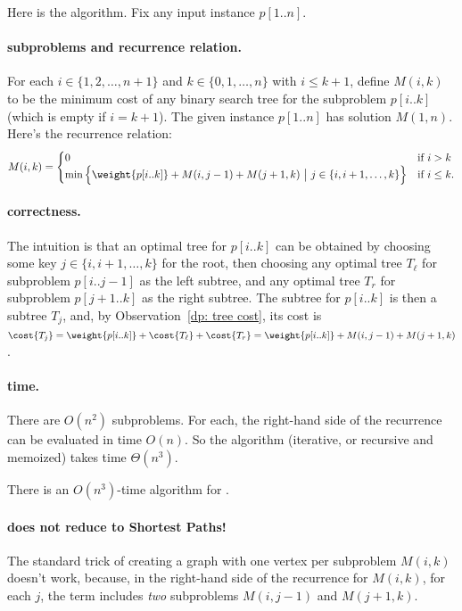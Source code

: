 Here is the algorithm.  Fix any input instance $p[1..n]$.

\paragraph{subproblems and recurrence relation.}
For each $i\in\{1,2,\ldots,n+1\}$ and $k\in\{0,1,\ldots,n\}$ with $i\le k+1$,
define $M(i, k)$
to be the minimum cost of any binary search tree for the subproblem $p[i..k]$
(which is empty if $i=k+1$).
The given instance $p[1..n]$ has solution $M(1, n)$.
Here's the recurrence relation:
\[M(i,k) =
  \begin{cases}
    0 & \text{if } i>k \\
    \min\Big\{ \weight {p[i..k]} + M(i, j-1) + M(j+1, k) ~\big|~ j \in \{i,i+1,\ldots,k\} \Big\}
    & \text{if } i \le k.
  \end{cases}
\]

\paragraph{correctness.}
The intuition is that an optimal tree for $p[i..k]$
can be obtained by choosing some key $j\in\{i,i+1,\ldots,k\}$ for the root,
then choosing any optimal tree $T_\ell$ for subproblem $p[i..j-1]$ as the left subtree,
and any optimal tree $T_r$ for subproblem $p[j+1..k]$ as the right subtree.
The subtree for $p[i..k]$ is then a subtree $T_j$,
and, by Observation~\ref{dp: tree cost}, its cost is
$\cost {T_j} = \weight {p[i..k]} + \cost {T_\ell} + \cost {T_r}
= \weight {p[i..k]} + M(i,j-1) + M(j+1, k)$.

\paragraph{time.}
There are $O(n^2)$ subproblems.
For each, the right-hand side of the recurrence can be evaluated in time $O(n)$.
So the algorithm (iterative, or recursive and memoized)
takes time $\Theta(n^3)$.

\begin{theorem}
  There is an $O(n^3)$-time algorithm for .
\end{theorem}

\paragraph{does not reduce to Shortest Paths!}
The standard trick of creating a graph with one vertex per subproblem $M(i,k)$
doesn't work, because, in the right-hand side of the recurrence for $M(i,k)$,
for each $j$, the term includes \emph{two} subproblems $M(i,j-1)$ and $M(j+1, k)$.

  
